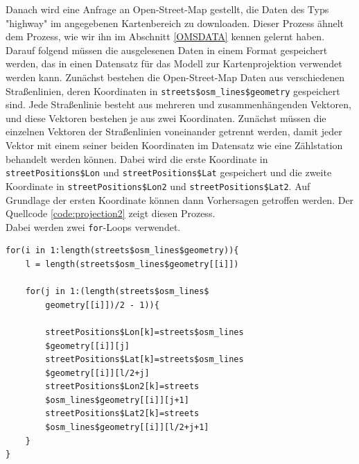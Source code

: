 \documentclass[a4paper,12pt]{thesis}
\begin{document}
Danach wird eine Anfrage an Open-Street-Map gestellt, die Daten des Typs "highway" im angegebenen Kartenbereich zu downloaden. Dieser Prozess ähnelt dem Prozess, wie wir ihn im Abschnitt \ref{OMSDATA} kennen gelernt haben.\\
Darauf folgend müssen die ausgelesenen Daten in einem Format gespeichert werden, das in einen Datensatz für das Modell zur Kartenprojektion verwendet werden kann. Zunächst bestehen die Open-Street-Map Daten aus verschiedenen Straßenlinien, deren Koordinaten in \lstinline|streets$osm_lines$geometry| gespeichert sind. Jede Straßenlinie besteht aus mehreren und zusammenhängenden Vektoren, und diese Vektoren bestehen je aus zwei Koordinaten. Zunächst müssen die einzelnen Vektoren der Straßenlinien voneinander getrennt werden, damit jeder Vektor mit einem seiner beiden Koordinaten im Datensatz wie eine Zählstation behandelt werden können. Dabei wird die erste Koordinate in \lstinline|streetPositions$Lon| und \lstinline|streetPositions$Lat| gespeichert und die zweite Koordinate in \lstinline|streetPositions$Lon2| und \lstinline|streetPositions$Lat2|. Auf Grundlage der ersten Koordinate können dann Vorhersagen getroffen werden. Der Quellcode \ref{code:projection2} zeigt diesen Prozess.\\
Dabei werden zwei \lstinline|for|-Loops verwendet.

\begin{minipage}{\linewidth}
\begin{lstlisting}[caption={Wahl des Kartenausschnitts},label=code:projection2]
for(i in 1:length(streets$osm_lines$geometry)){
	l = length(streets$osm_lines$geometry[[i]])
	
	for(j in 1:(length(streets$osm_lines$
		geometry[[i]])/2 - 1)){
	
		streetPositions$Lon[k]=streets$osm_lines
		$geometry[[i]][j]
		streetPositions$Lat[k]=streets$osm_lines
		$geometry[[i]][l/2+j]
		streetPositions$Lon2[k]=streets
		$osm_lines$geometry[[i]][j+1]
		streetPositions$Lat2[k]=streets
		$osm_lines$geometry[[i]][l/2+j+1]
	}
}
	
\end{lstlisting}
\end{minipage}
\end{document}
